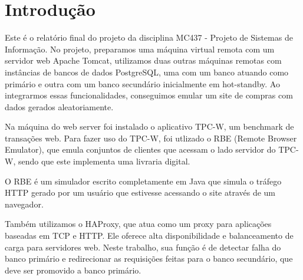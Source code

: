 \documentclass[11pt,twoside]{article}
\begin{document}
\begin{abstract}
\setlength{\parindent}{4ex}
Este é o relat\'orio final do projeto da disciplina MC437 (Projeto de Sistemas de Informa\c{c}\~ao), projeto cujo objetivo foi a resolução de um problema de replicação de banco de dados. Foram utilizados dois bancos de dados diferentes, um atuando como primário e outro como secundário. O primário é replicado para um secundário em hot-standby. Ao inserirmos uma falha neste, promovemos o secundário para primário e fazemos o antigo primário voltar como secundário, sendo que o objetivo é deixar o menor tempo de indisponibilidade possível no sistema.
Utilizamos o benchmark TPC-W, que modela uma livraria online, atrav\'es de um ambiente controlado, para simular atividades num servidor WEB. Em conjunto com o simulador RBE, que gera tr\^es diferentes perfis de carga (Shopping, Ordering e Browsing), pudemos checar o desempenho do servidor instalado num cluster no IC, ao verificarmos o n\'umero de WIPS (WEB Interactions per Second) e WIRT (WEB Interaction Response Time) gerados por diferentes cargas.
\end{abstract}

\section{Introdução}
Este \'e o relat\'orio final do projeto da disciplina MC437 - Projeto de Sistemas de Informação. No projeto, preparamos uma m\'aquina virtual remota com um servidor  web Apache Tomcat, utilizamos duas outras máquinas remotas com instâncias de bancos de dados PostgreSQL, uma com um banco atuando como primário e outra com um banco secundário inicialmente em hot-standby. Ao integrarmos essas funcionalidades, conseguimos emular um site de compras com dados gerados aleatoriamente.

    Na m\'aquina do web server foi instalado o aplicativo TPC-W, um benchmark de transa\c{c}\~oes web. Para fazer uso do TPC-W, foi utlizado o RBE (Remote Browser Emulator), que emula conjuntos de clientes que acessam o lado servidor do TPC-W, sendo que este implementa uma livraria digital.

    O RBE \'e um simulador escrito completamente em Java que simula o tr\'afego HTTP gerado por um usu\'ario que estivesse acessando o site atrav\'es de um navegador.

    Também utilizamos o HAProxy, que atua como um proxy para aplicações baseadas em TCP e HTTP. Ele oferece alta disponibilidade e balanceamento de carga para servidores web. Neste trabalho, sua função é de detectar falha do banco primário e redirecionar as requisições feitas para o banco secundário, que deve ser promovido a banco primário.
\end{document}
